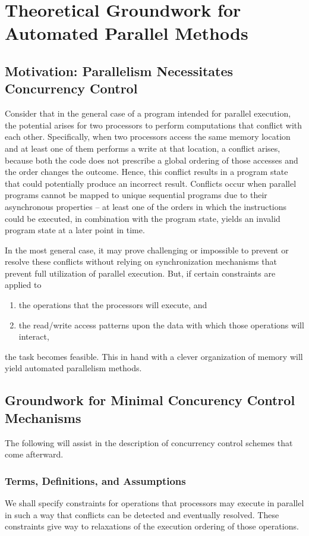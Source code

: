 \chapter{Theoretical Groundwork for Automated Parallel Methods}

\section{Motivation: Parallelism Necessitates Concurrency Control}
Consider that in the general case of a program intended for parallel execution,
the potential arises for two processors to perform computations that conflict
with each other. Specifically, when two processors access the same memory
location and at least one of them performs a write at that location, a conflict
arises, because both the code does not prescribe a global ordering of those
accesses and the order changes the outcome. Hence, this conflict results in a
program state that could potentially produce an incorrect result. Conflicts
occur when parallel programs cannot be mapped to unique sequential programs due
to their asynchronous properties -- at least one of the orders in which the
instructions could be executed, in combination with the program state, yields
an invalid program state at a later point in time.

In the most general case, it may prove challenging or impossible to prevent or
resolve these conflicts without relying on synchronization mechanisms that
prevent full utilization of parallel execution. But, if certain constraints are
applied to
\begin{enumerate}
    \item the operations that the processors will execute, and
    \item the read/write access patterns upon the data with which those
        operations will interact,
\end{enumerate}

the task becomes feasible. This in hand with a clever organization of memory
will yield automated parallelism methods.

\section{Groundwork for Minimal Concurency Control Mechanisms}
The following will assist in the description of concurrency control schemes that
come afterward.

\subsection{Terms, Definitions, and Assumptions}
We shall specify constraints for operations that processors may execute in
parallel in such a way that conflicts can be detected and eventually resolved.
These constraints give way to relaxations of the execution ordering of those
operations.

